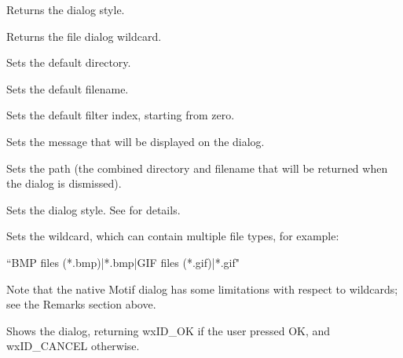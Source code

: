 \label{wxfiledialoggetstyle}


Returns the dialog style.

\label{wxfiledialoggetwildcard}


Returns the file dialog wildcard.

\label{wxfiledialogsetdirectory}


Sets the default directory.

\label{wxfiledialogsetfilename}


Sets the default filename.

\label{wxfiledialogsetfilterindex}


Sets the default filter index, starting from zero.

\label{wxfiledialogsetmessage}


Sets the message that will be displayed on the dialog.

\label{wxfiledialogsetpath}


Sets the path (the combined directory and filename that will be returned when the dialog is dismissed).

\label{wxfiledialogsetstyle}


Sets the dialog style. See  for details.

\label{wxfiledialogsetwildcard}


Sets the wildcard, which can contain multiple file types, for example:

``BMP files (*.bmp)|*.bmp|GIF files (*.gif)|*.gif"

Note that the native Motif dialog has some limitations with respect to
wildcards; see the Remarks section above.

\label{wxfiledialogshowmodal}


Shows the dialog, returning wxID\_OK if the user pressed OK, and wxID\_CANCEL
otherwise.


